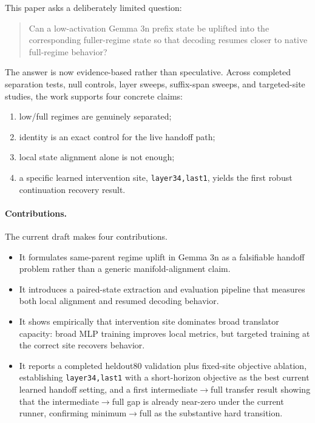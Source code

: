 \documentclass[11pt]{article}
\newcommand{\method}[1]{\texttt{#1}}
\begin{document}
This paper asks a deliberately limited question:
\begin{quote}
Can a low-activation Gemma 3n prefix state be uplifted into the corresponding fuller-regime state so that decoding resumes closer to native full-regime behavior?
\end{quote}

The answer is now evidence-based rather than speculative. Across completed separation tests, null controls, layer sweeps, suffix-span sweeps, and targeted-site studies, the work supports four concrete claims:
\begin{enumerate}[leftmargin=1.4em]
    \item low/full regimes are genuinely separated;
    \item identity is an exact control for the live handoff path;
    \item local state alignment alone is not enough;
    \item a specific learned intervention site, \method{layer34,last1}, yields the first robust continuation recovery result.
\end{enumerate}

\paragraph{Contributions.}
The current draft makes four contributions.
\begin{itemize}[leftmargin=1.4em]
    \item It formulates same-parent regime uplift in Gemma 3n as a falsifiable handoff problem rather than a generic manifold-alignment claim.
    \item It introduces a paired-state extraction and evaluation pipeline that measures both local alignment and resumed decoding behavior.
    \item It shows empirically that intervention site dominates broad translator capacity: broad MLP training improves local metrics, but targeted training at the correct site recovers behavior.
    \item It reports a completed heldout80 validation plus fixed-site objective ablation, establishing \method{layer34,last1} with a short-horizon objective as the best current learned handoff setting, and a first intermediate$\rightarrow$full transfer result showing that the intermediate$\rightarrow$full gap is already near-zero under the current runner, confirming minimum$\rightarrow$full as the substantive hard transition.
\end{itemize}
\end{document}
